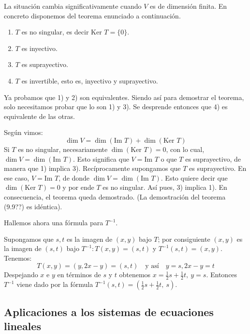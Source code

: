 La situación cambia significativamente cuando \(V\) es de dimensión finita. En concreto disponemos del teorema enunciado a continuación.

\begin{enumerate}
  \item \(T\) es no singular, es decir \(\text{Ker }T = \{0\}\).
  \item \(T\) es inyectivo.
  \item \(T\) es suprayectivo.
  \item \(T\) es invertible, esto es, inyectivo y suprayectivo.
\end{enumerate}

Ya probamos que 1) y 2) son equivalentes. Siendo así para demostrar el teorema, solo necesitamos probar que lo son 1) y 3). Se desprende entonces que 4) es equivalente de las otras.

Según vimos:
\[
  \dim V = \dim(\text{Im } T) + \dim(\text{Ker } T)
\]
Si \(T\) es no singular, necesariamente \(\dim(\text{Ker } T) = 0\), con lo cual, \(\dim V = \dim(\text{Im }T)\). Esto significa que \(V = \text{Im } T\) o que \(T\) es suprayectivo, de manera que 1) implica 3). Recíprocamente supongamos que \(T\) es suprayectivo. En ese caso, \(V = \text{Im }T\), de donde \(\dim V = \dim(\text{Im }T)\). Esto quiere decir que \(\dim(\text{Ker } T) = 0\) y por ende \(T\) es no singular. Así pues, 3) implica 1). En consecuencia, el teorema queda demostrado. (La demostración del teorema (9.9??) es idéntica).


Hallemos ahora una fórmula para \(T^{-1}\).

Supongamos que \(s,t\) es la imagen de \((x,y)\) bajo \(T\); por consiguiente \((x,y)\) es la imagen de \((s,t)\) bajo \(T^{-1}:T(x,y) = (s,t)\) y \(T^{-1}(s,t)=(x,y)\). Tenemos:
\[
  T(x,y) = (y,2x-y) = (s,t) \quad \text{y así} \quad y=s,2x-y = t
\]
Despejando \(x\) e \(y\) en términos de \(s\) y \(t\) obtenemos \(x=\frac{1}{2}s + \frac{1}{2}t,~ y=s\). Entonces \(T^{-1}\) viene dado por la fórmula \(T^{-1}(s,t) = \left(\frac{1}{2}s+\frac{1}{2}t,~s\right)\).

\subsection{Aplicaciones a los sistemas de ecuaciones lineales}


